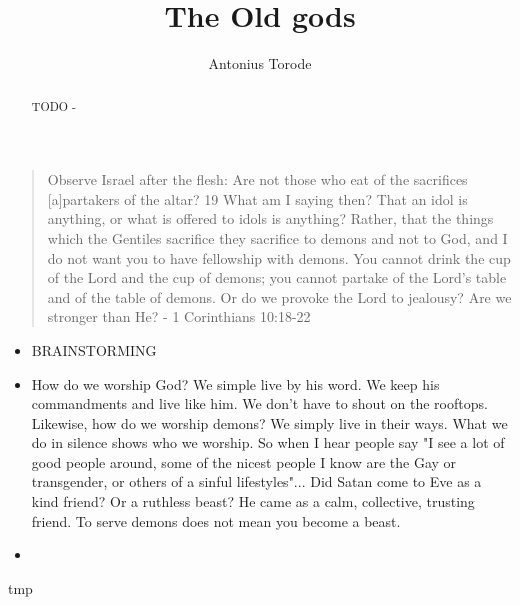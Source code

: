 \documentclass[10pt]{article}
\title{The Old gods}
\author{Antonius Torode}
\begin{document}
\maketitle
\thispagestyle{fancy}


\begin{abstract}
TODO - \lipsum[0-1]
\end{abstract}

\begin{multicols}{2}

\begin{quotation}
Observe Israel after the flesh: Are not those who eat of the sacrifices [a]partakers of the altar? 19 What am I saying then? That an idol is anything, or what is offered to idols is anything? Rather, that the things which the Gentiles sacrifice they sacrifice to demons and not to God, and I do not want you to have fellowship with demons. You cannot drink the cup of the Lord and the cup of demons; you cannot partake of the Lord’s table and of the table of demons. Or do we provoke the Lord to jealousy? Are we stronger than He? - 1 Corinthians 10:18-22
\end{quotation}

\begin{itemize}
\item BRAINSTORMING
\item How do we worship God? We simple live by his word. We keep his commandments and live like him. We don't have to shout on the rooftops. Likewise, how do we worship demons? We simply live in their ways. What we do in silence shows who we worship. So when I hear people say "I see a lot of good people around, some of the nicest people I know are the Gay or transgender, or others of a sinful lifestyles"... Did Satan come to Eve as a kind friend? Or a ruthless beast? He came as a calm, collective, trusting friend. To serve demons does not mean you become a beast.
\item
\end{itemize}


\begin{thebibliography}{9}
	{\footnotesize
		
	 tmp
	
	}
\end{thebibliography}

\end{multicols}


\end{document}

